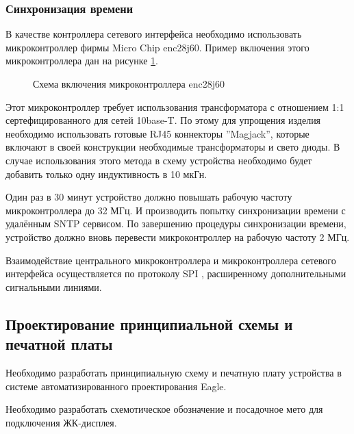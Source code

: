 \subsubsection{Синхронизация времени}
\begin{par}
В качестве контроллера сетевого интерфейса необходимо использовать микроконтроллер фирмы Micro Chip
enc28j60. Пример включения этого микроконтроллера дан на рисунке \ref{img:ienc28j60}.
\begin{figure}[h]
	\caption{Схема включения микроконтроллера enc28j60}
	\label{img:ienc28j60}
\end{figure}

Этот микроконтроллер требует использования трансформатора с отношением 1:1 сертефицированного
для сетей 10base-T. По этому для упрощения изделия необходимо использовать готовые RJ45
коннекторы ''Magjack'', которые включают в своей конструкции необходимые трансформаторы и
свето диоды. В случае использования этого метода в схему устройства необходимо будет добавить
только одну индуктивность в 10 мкГн.
\end{par}

\begin{par}
Один раз в 30 минут устройство должно повышать рабочую частоту микроконтроллера до 32 МГц.
И производить попытку синхронизации времени с удалённым SNTP сервисом. По завершению процедуры
синхронизации времени, устройство должно вновь перевести микроконтроллер на рабочую частоту 2 МГц.
\end{par}

\begin{par}
Взаимодействие центрального микроконтроллера и микроконтроллера сетевого интерфейса осуществляется
по протоколу SPI \cite{enc28j60}, расширенному дополнительными сигнальными линиями.
\end{par}


\subsection{Проектирование принципиальной схемы и печатной платы}
\begin{par}
Необходимо разработать принципиальную схему и печатную плату устройства в системе автоматизированного
проектирования Eagle.
\end{par}

\begin{par}
Необходимо разработать схемотическое обозначение и посадочное мето для подключения ЖК-дисплея.
\end{par}

